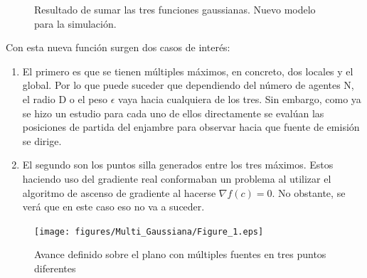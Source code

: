 \begin{figure}[H]
  \begin{center}
    \caption{Resultado de sumar las tres funciones gaussianas. Nuevo modelo para la simulación.}
    \label{New_Gaussiana}
  \end{center}
\end{figure}
\newpage
Con esta nueva función surgen dos casos de interés:

\begin{enumerate}
	\item El primero es que se tienen múltiples máximos, en concreto, dos locales y el global. Por lo que puede suceder que dependiendo del número de agentes N, el radio D o el peso $\epsilon$ vaya hacia cualquiera de los tres. Sin embargo, como ya se hizo un estudio para cada uno de ellos directamente se evalúan las posiciones de partida del enjambre para observar hacia que fuente de emisión se dirige.
	\item El segundo son los puntos silla generados entre los tres máximos. Estos haciendo uso del gradiente real conformaban un problema al utilizar el algoritmo de ascenso de gradiente al hacerse $\nabla{f\left(c\right)}=0$. No obstante, se verá que en este caso eso no va a suceder.
\end{enumerate}
	
\begin{figure}[H]
\centering
\texttt{[image: figures/Multi\_Gaussiana/Figure\_1.eps]}
\caption{Avance definido sobre el plano con múltiples fuentes en tres puntos diferentes} \label{Multiples_Fuentes}
\end{figure}

